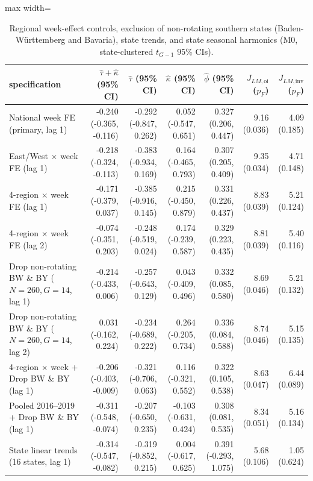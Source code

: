 \begin{table}[!t]
\centering
\caption{Regional week-effect controls, exclusion of non-rotating southern states (Baden-W\"urttemberg and Bavaria), state trends, and state seasonal harmonics (M0, state-clustered $t_{G-1}$ 95\% CIs).}
\label{tab:rev-regional}
\footnotesize
\setlength{\tabcolsep}{3.0pt}
\begin{adjustbox}{max width=\linewidth}
\begin{tabular}{lrrrrrr}
\toprule
specification & $\hat\tau+\hat\kappa$ (95\% CI) & $\hat\tau$ (95\% CI) & $\hat\kappa$ (95\% CI) & $\hat\phi$ (95\% CI) & $J_{LM,\mathrm{oi}}$ ($p_F$) & $J_{LM,\mathrm{inv}}$ ($p_F$) \\
\midrule
National week FE (primary, lag 1) & -0.240 (-0.365, -0.116) & -0.292 (-0.847, 0.262) & 0.052 (-0.547, 0.651) & 0.327 (0.206, 0.447) & 9.16 (0.036) & 4.09 (0.185) \\
East/West $\times$ week FE (lag 1) & -0.218 (-0.324, -0.113) & -0.383 (-0.934, 0.169) & 0.164 (-0.465, 0.793) & 0.307 (0.205, 0.409) & 9.35 (0.034) & 4.71 (0.148) \\
4-region $\times$ week FE (lag 1) & -0.171 (-0.379, 0.037) & -0.385 (-0.916, 0.145) & 0.215 (-0.450, 0.879) & 0.331 (0.226, 0.437) & 8.83 (0.039) & 5.21 (0.124) \\
4-region $\times$ week FE (lag 2) & -0.074 (-0.351, 0.203) & -0.248 (-0.519, 0.024) & 0.174 (-0.239, 0.587) & 0.329 (0.223, 0.435) & 8.81 (0.039) & 5.40 (0.116) \\
Drop non-rotating BW \& BY ($N=260, G=14$, lag 1) & -0.214 (-0.433, 0.006) & -0.257 (-0.643, 0.129) & 0.043 (-0.409, 0.496) & 0.332 (0.085, 0.580) & 8.69 (0.046) & 5.21 (0.132) \\
Drop non-rotating BW \& BY ($N=260, G=14$, lag 2) & 0.031 (-0.162, 0.224) & -0.234 (-0.689, 0.222) & 0.264 (-0.205, 0.734) & 0.336 (0.084, 0.588) & 8.74 (0.046) & 5.15 (0.135) \\
4-region $\times$ week + Drop BW \& BY (lag 1) & -0.206 (-0.403, -0.009) & -0.321 (-0.706, 0.063) & 0.116 (-0.321, 0.552) & 0.322 (0.105, 0.538) & 8.63 (0.047) & 6.44 (0.089) \\
Pooled 2016--2019 + Drop BW \& BY (lag 1) & -0.311 (-0.548, -0.074) & -0.207 (-0.650, 0.235) & -0.103 (-0.631, 0.424) & 0.308 (0.081, 0.535) & 8.34 (0.051) & 5.16 (0.134) \\
State linear trends (16 states, lag 1) & -0.314 (-0.547, -0.082) & -0.319 (-0.852, 0.215) & 0.004 (-0.617, 0.625) & 0.391 (-0.293, 1.075) & 5.68 (0.106) & 1.05 (0.624) \\

\end{tabular}
\end{adjustbox}
\end{table}

